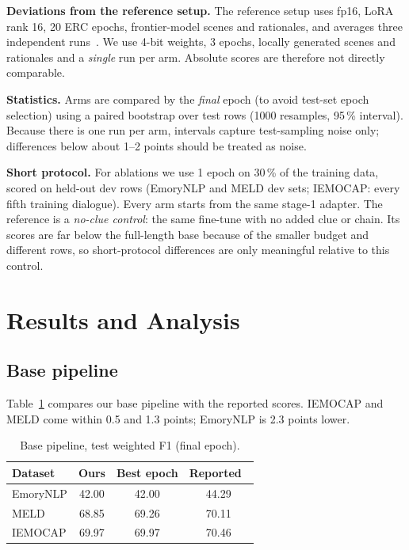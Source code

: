 \documentclass[lettersize,journal]{IEEEtran}
\begin{document}
\textbf{Deviations from the reference setup.} The reference setup uses fp16, LoRA rank 16, 20 ERC epochs, frontier-model scenes and rationales, and averages three independent runs~\cite{coe2025}. We use 4-bit weights, 3 epochs, locally generated scenes and rationales and a \emph{single} run per arm. Absolute scores are therefore not directly comparable.

\textbf{Statistics.} Arms are compared by the \emph{final} epoch (to avoid test-set epoch selection) using a paired bootstrap over test rows (1000 resamples, 95\,\% interval). Because there is one run per arm, intervals capture test-sampling noise only; differences below about 1--2 points should be treated as noise.

\textbf{Short protocol.} For ablations we use 1 epoch on 30\,\% of the training data, scored on held-out dev rows (EmoryNLP and MELD dev sets; IEMOCAP: every fifth training dialogue). Every arm starts from the same stage-1 adapter. The reference is a \emph{no-clue control}: the same fine-tune with no added clue or chain. Its scores are far below the full-length base because of the smaller budget and different rows, so short-protocol differences are only meaningful relative to this control.

\section{Results and Analysis}
\subsection{Base pipeline}
Table~\ref{tab:base} compares our base pipeline with the reported scores. IEMOCAP and MELD come within 0.5 and 1.3 points; EmoryNLP is 2.3 points lower.

\begin{table}[!t]
\caption{Base pipeline, test weighted F1 (final epoch).}\label{tab:base}
\centering\small
\begin{tabular}{lccc}
\toprule
Dataset & Ours & Best epoch & Reported~\cite{coe2025}\\
\midrule
EmoryNLP & 42.00 & 42.00 & 44.29\\
MELD & 68.85 & 69.26 & 70.11\\
IEMOCAP & 69.97 & 69.97 & 70.46\\
\bottomrule
\end{tabular}
\end{table}
\end{document}
